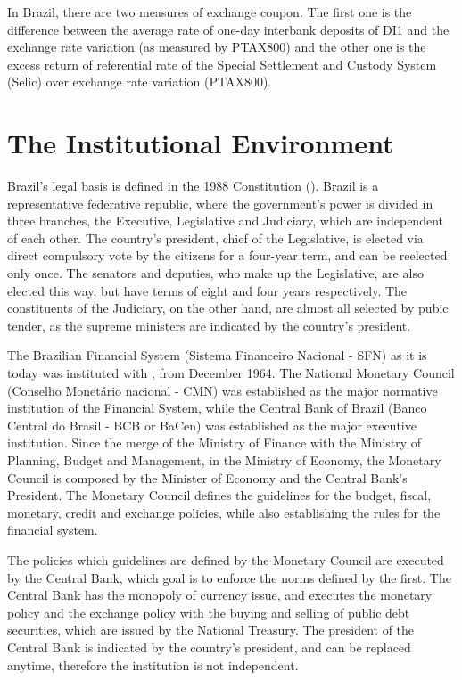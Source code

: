 \documentclass[a4paper]{article}
\begin{document}
In Brazil, there are two measures of exchange coupon. The first one is the difference between the average rate of one-day interbank deposits of DI1 and the exchange rate variation (as measured by PTAX800) and the other one is the excess return of referential rate of the Special Settlement and Custody System (Selic) over exchange rate variation (PTAX800).


\section{The Institutional Environment}


Brazil's legal basis is defined in the 1988 Constitution (\citet{constituicao}). Brazil is a representative federative republic, where the government's power is divided in three branches, the Executive, Legislative and Judiciary, which are independent of each other. The country's president, chief of the Legislative, is elected via direct compulsory vote by the citizens for a four-year term, and can be reelected only once. The senators and deputies, who make up the Legislative, are also elected this way, but have terms of eight and four years respectively. The constituents of the Judiciary, on the other hand, are almost all selected by pubic tender, as the supreme ministers are indicated by the country's president.

The Brazilian Financial System (Sistema Financeiro Nacional - SFN) as it is today was instituted with \citet{lei4595}, from December 1964. The National Monetary Council (Conselho Monetário nacional - CMN) was established as the major normative institution of the Financial System, while the Central Bank of Brazil (Banco Central do Brasil - BCB or BaCen) was established as the major executive institution. Since the merge of the Ministry of Finance with the Ministry of Planning, Budget and Management, in the Ministry of Economy, the Monetary Council is composed by the Minister of Economy and the Central Bank's President. The Monetary Council defines the guidelines for the budget, fiscal, monetary, credit and exchange policies, while also establishing the rules for the financial system.

The policies which guidelines are defined by the Monetary Council are executed by the Central Bank, which goal is to enforce the norms defined by the first. The Central Bank has the monopoly of currency issue, and executes the monetary policy and the exchange policy with the buying and selling of public debt securities, which are issued by the National Treasury. The president of the Central Bank is indicated by the country's president, and can be replaced anytime, therefore the institution is not independent.
\end{document}
